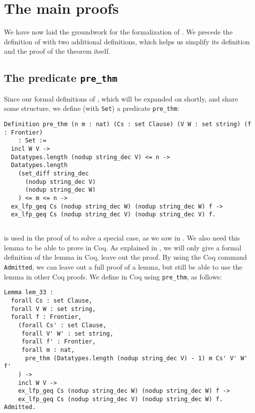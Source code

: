 \section{The main proofs}

We have now laid the groundwork for the formalization of .
We precede the definition of  with two additional definitions, which helps us simplify its
definition and the proof of the theorem itself.

\subsection{The predicate \lstinline{pre_thm}}

Since our formal definitions of , which will be expanded on shortly,
and  share some structure, we define (with \lstinline{Set}) a predicate \lstinline{pre_thm}:

\begin{minipage}{\linewidth}
\begin{lstlisting}[language=Coq, label={lst:pre_thm_def}, caption={\lstinline{pre_thm} in Coq}]
Definition pre_thm (n m : nat) (Cs : set Clause) (V W : set string) (f : Frontier)
    : Set :=
  incl W V ->
  Datatypes.length (nodup string_dec V) <= n ->
  Datatypes.length
    (set_diff string_dec
      (nodup string_dec V)
      (nodup string_dec W)
    ) <= m <= n ->
  ex_lfp_geq Cs (nodup string_dec W) (nodup string_dec W) f ->
  ex_lfp_geq Cs (nodup string_dec V) (nodup string_dec V) f.
\end{lstlisting}
\end{minipage}

\subsection{}

 is used in the proof of  to solve
a special case, as we saw in .
We also need this lemma to be able to prove  in Coq.
As explained in ,
we will only give a formal definition of the lemma in Coq,
leave out the proof. By using the Coq command \lstinline{Admitted},
we can leave out a full proof of a lemma, but still be able to use the lemma in other Coq proofs.
We define  in Coq using \lstinline{pre_thm}, as follows:

\begin{minipage}{\linewidth}
\begin{lstlisting}[language=Coq, label={lst:lem_33}, caption={\Cref{lem:3.3} in Coq}]
Lemma lem_33 :
  forall Cs : set Clause,
  forall V W : set string,
  forall f : Frontier,
    (forall Cs' : set Clause,
     forall V' W' : set string,
     forall f' : Frontier,
     forall m : nat,
      pre_thm (Datatypes.length (nodup string_dec V) - 1) m Cs' V' W' f'
    ) ->
    incl W V ->
    ex_lfp_geq Cs (nodup string_dec W) (nodup string_dec W) f ->
    ex_lfp_geq Cs (nodup string_dec V) (nodup string_dec W) f.
Admitted.
\end{lstlisting}
\end{minipage}

